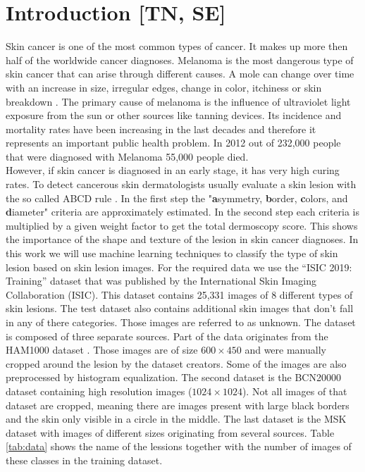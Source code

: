 
\section{Introduction [TN, SE]}\label{sec:introduction}
Skin cancer is one of the most common types of cancer. It makes up more then half of the worldwide cancer diagnoses. Melanoma is the most dangerous type of skin cancer that can arise through different causes. A mole can change over time with an increase in size, irregular edges, change in color, itchiness or skin breakdown \cite{Zaqout19}. The primary cause of melanoma is the influence of ultraviolet light exposure from the sun or other sources like tanning devices. Its incidence and mortality rates have been increasing in the last decades \cite{Lens04} and therefore it represents an important public health problem. In 2012 out of 232,000 people that were diagnosed with Melanoma 55,000 people died. \\
However, if skin cancer is diagnosed in an early stage, it has very high curing rates. To detect cancerous skin dermatologists usually evaluate a skin lesion with the so called ABCD rule \cite{Stolz94}. In the first step the "\textbf{a}symmetry, \textbf{b}order, \textbf{c}olors, and \textbf{d}iameter" criteria are approximately estimated. In the second step each criteria is multiplied by a given weight factor to get the total dermoscopy score. This shows the importance of the shape and texture of the lesion in skin cancer diagnoses.\newline \newline
In this work we will use machine learning techniques to classify the type of skin lesion based on skin lesion images. For the required data we use the ``ISIC 2019: Training'' dataset that was published by the International Skin Imaging Collaboration (ISIC). This dataset contains 25,331 images of 8 different types of skin lesions. The test dataset also contains additional skin images that don't fall in any of there categories. Those images are referred to as unknown. 
The dataset is composed of three separate sources. Part of the data originates from the HAM1000 dataset \cite{HAM10000}. Those images are of size $600 \times 450$ and were manually cropped around the lesion by the dataset creators. Some of the images are also preprocessed by histogram equalization. %
The second dataset is the BCN20000 dataset \cite{bcn20000} containing high resolution images ($1024 \times 1024$). Not all images of that dataset are cropped, meaning there are images present with large black borders and the skin only visible in a circle in the middle. The last dataset is the MSK dataset \cite{MSK_Data} with images of different sizes originating from several sources. 
Table \ref{tab:data} shows the name of the lessions together with the number of images of these classes in the training dataset.

